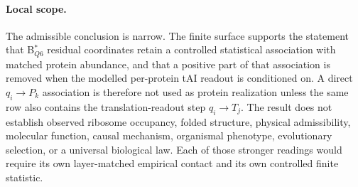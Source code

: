 \paragraph{Local scope.}
The admissible conclusion is narrow.  The finite surface supports the statement that B$^{*}_{Q6}$ residual coordinates retain a controlled statistical association with matched protein abundance, and that a positive part of that association is removed when the modelled per-protein tAI readout is conditioned on.  A direct $q_i\to P_k$ association is therefore not used as protein realization unless the same row also contains the translation-readout step $q_i\to T_j$.  The result does not establish observed ribosome occupancy, folded structure, physical admissibility, molecular function, causal mechanism, organismal phenotype, evolutionary selection, or a universal biological law.  Each of those stronger readings would require its own layer-matched empirical contact and its own controlled finite statistic.
